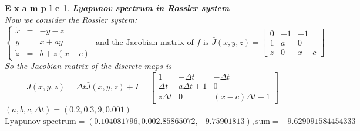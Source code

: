 \documentclass[12pt]{article}
\theoremstyle{plain}
\newtheorem{example}{\textbf{E x a m p l e}}[section]
\begin{document}
\begin{example}\textbf{Lyapunov spectrum in Rossler system}
\\\noindent Now we consider the Rossler system:
$$
\left\{\begin{array}{lll}
\dot x & = & -y-z \\
\dot y & = & x+ay \\
\dot z & = & b+z(x-c)
\end{array}\right. \text{ and the Jacobian matrix of $f$ is } \bar J(x, y, z) = \left[\begin{array}{lll}
0           & -1        & -1        \\
1           & a         & 0         \\
z           & 0         & x-c
\end{array}\right]
$$
So the Jacobian matrix of the discrete maps is 
$$
J(x, y, z) = \Delta t\bar J(x, y, z) + I = \left[\begin{array}{lll}
1                   & -\Delta t         & -\Delta t         \\
\Delta t            & a\Delta t + 1     & 0                 \\
z\Delta t           & 0                 & (x-c)\Delta t + 1
\end{array}\right]
$$
  \noindent $(a, b, c, \Delta t) = (0.2, 0.3, 9, 0.001)$
\\\noindent$\text{Lyapunov spectrum} = (0.104081796, 0.002.85865072, -9.75901813), \text{sum} = -9.629091584454333$
\end{example}
\end{document}
